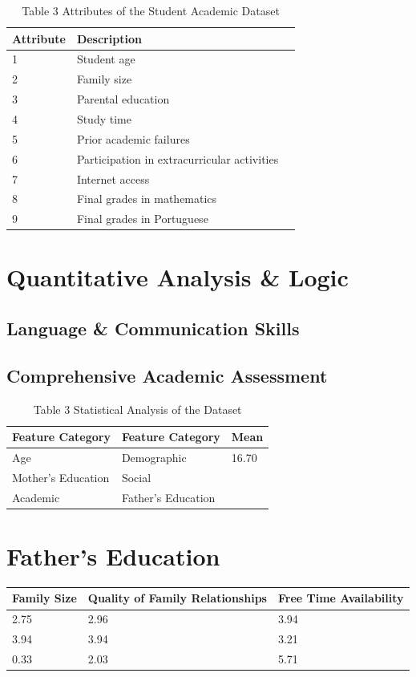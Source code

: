 \documentclass[twocolumn]{svjour3}
\begin{document}
\begin{table}[h]
\centering
\caption{Table 3 Attributes of the Student Academic Dataset}
\label{tab:table3}
\begin{tabular}{lll}
\hline
Attribute & Description & \\
\hline
1 & Student age & \\
2 & Family size & \\
3 & Parental education & \\
4 & Study time & \\
5 & Prior academic failures & \\
6 & Participation in extracurricular activities & \\
7 & Internet access & \\
8 & Final grades in mathematics & \\
9 & Final grades in Portuguese & \\
\hline
\end{tabular}
\end{table}

\section{Quantitative Analysis \& Logic}
\subsection{Language \& Communication Skills}
\subsection{Comprehensive Academic Assessment}
\begin{table}
\centering
\caption{Table 3 Statistical Analysis of the Dataset}
\begin{tabular}{lll}
\hline
Feature Category & Feature Category & Mean \\
\hline
Age & Demographic & 16.70 \\
\hline
Mother's Education & Social & \\
\hline
Academic & Father's Education & \\
\hline
\end{tabular}
\end{table}

\section{Father's Education}
\begin{tabular}{lll}
\hline
Family Size & Quality of Family Relationships & Free Time Availability \\
\hline
2.75 & 2.96 & 3.94 \\
3.94 & 3.94 & 3.21 \\
0.33 & 2.03 & 5.71 \\
\hline
\end{tabular}
\end{document}
